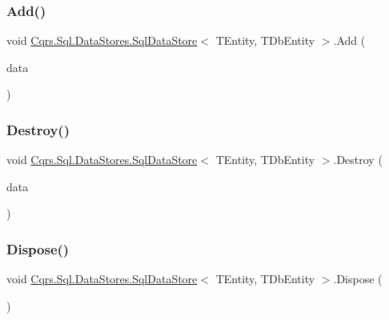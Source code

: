 \subsubsection{\texorpdfstring{Add()}{Add()}\hspace{0.1cm}{\footnotesize\ttfamily [2/2]}}
{\footnotesize\ttfamily void \hyperlink{classCqrs_1_1Sql_1_1DataStores_1_1SqlDataStore}{Cqrs.\+Sql.\+Data\+Stores.\+Sql\+Data\+Store}$<$ T\+Entity, T\+Db\+Entity $>$.Add (\begin{DoxyParamCaption}\item[{I\+Enumerable$<$ T\+Entity $>$}]{data }\end{DoxyParamCaption})}

\mbox{\label{classCqrs_1_1Sql_1_1DataStores_1_1SqlDataStore_a5065ed1d4b5c66324afcde4acc68ad6b_a5065ed1d4b5c66324afcde4acc68ad6b}} 
\subsubsection{\texorpdfstring{Destroy()}{Destroy()}}
{\footnotesize\ttfamily void \hyperlink{classCqrs_1_1Sql_1_1DataStores_1_1SqlDataStore}{Cqrs.\+Sql.\+Data\+Stores.\+Sql\+Data\+Store}$<$ T\+Entity, T\+Db\+Entity $>$.Destroy (\begin{DoxyParamCaption}\item[{T\+Entity}]{data }\end{DoxyParamCaption})}

\mbox{\label{classCqrs_1_1Sql_1_1DataStores_1_1SqlDataStore_ac142d009f768519891ca12185a2e6191_ac142d009f768519891ca12185a2e6191}} 
\subsubsection{\texorpdfstring{Dispose()}{Dispose()}}
{\footnotesize\ttfamily void \hyperlink{classCqrs_1_1Sql_1_1DataStores_1_1SqlDataStore}{Cqrs.\+Sql.\+Data\+Stores.\+Sql\+Data\+Store}$<$ T\+Entity, T\+Db\+Entity $>$.Dispose (\begin{DoxyParamCaption}{ }\end{DoxyParamCaption})}



